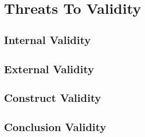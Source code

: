 \section{Threats To Validity}\label{sec:threats}



\subsection{Internal Validity}
\subsection{External Validity}
\subsection{Construct Validity}
\subsection{Conclusion Validity}